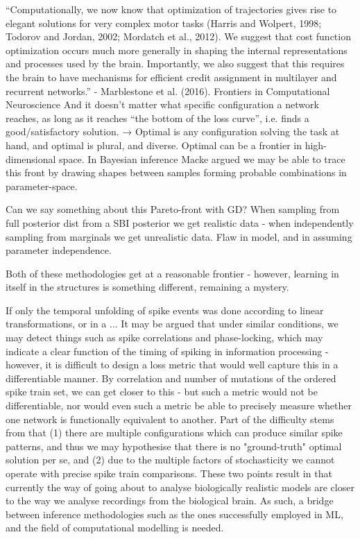 \documentclass[mphil,deptreport,ai]{infthesis} %
\begin{document}
“Computationally, we now know that optimization of trajectories gives rise to elegant solutions for very complex motor tasks (Harris and Wolpert, 1998; Todorov and Jordan, 2002; Mordatch et al., 2012). We suggest that cost function optimization occurs much more generally in shaping the internal representations and processes used by the brain. Importantly, we also suggest that this requires the brain to have mechanisms for efficient credit assignment in multilayer and recurrent networks.” - Marblestone et al. (2016). Frontiers in Computational Neuroscience
And it doesn’t matter what specific configuration a network reaches, as long as it reaches “the bottom of the loss curve”, i.e. finds a good/satisfactory solution. → Optimal is any configuration solving the task at hand, and optimal is plural, and diverse. Optimal can be a frontier in high-dimensional space. In Bayesian inference Macke argued we may be able to trace this front by drawing shapes between samples forming probable combinations in parameter-space.

Can we say something about this Pareto-front with GD?
When sampling from full posterior dist from a SBI posterior we get realistic data - when independently sampling from marginals we get unrealistic data. Flaw in model, and in assuming parameter independence.

Both of these methodologies get at a reasonable frontier - however, learning in itself in the structures is something different, remaining a mystery.


If only the temporal unfolding of spike events was done according to linear transformations, or in a ...
It may be argued that under similar conditions, we may detect things such as spike correlations and phase-locking, which may indicate a clear function of the timing of spiking in information processing - however, it is difficult to design a loss metric that would well capture this in a differentiable manner.
By correlation and number of mutations of the ordered spike train set, we can get closer to this - but such a metric would not be differentiable, nor would even such a metric be able to precisely measure whether one network is functionally equivalent to another.
Part of the difficulty stems from that (1) there are multiple configurations which can produce similar spike patterns, and thus we may hypothesise that there is no "ground-truth" optimal solution per se, and (2) due to the multiple factors of stochasticity we cannot operate with precise spike train comparisons. These two points result in that currently the way of going about to analyse biologically realistic models are closer to the way we analyse recordings from the biological brain. As such, a bridge between inference methodologies such as the ones successfully employed in ML, and the field of computational modelling is needed.
\end{document}
